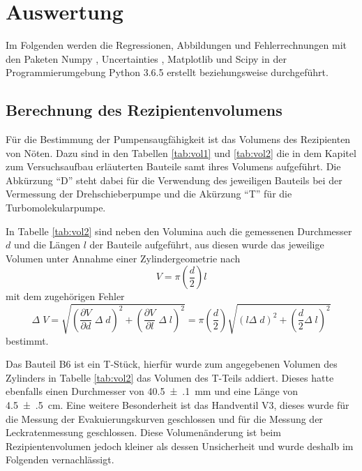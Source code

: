 \newpage
\section{Auswertung}
\label{sec:Auswertung}

Im Folgenden werden die Regressionen, Abbildungen und Fehlerrechnungen mit den
Paketen Numpy \cite{numpy}, Uncertainties \cite{uncertainties}, Matplotlib
\cite{matplotlib} und Scipy \cite{scipy} in der Programmierumgebung
Python 3.6.5 erstellt beziehungsweise durchgeführt.

\subsection{Berechnung des Rezipientenvolumens}
\label{sec:Volumina}

Für die Bestimmung der Pumpensaugfähigkeit ist das Volumens des Rezipienten
von Nöten. Dazu sind in den Tabellen \ref{tab:vol1} und \ref{tab:vol2} die
in dem Kapitel zum Versuchsaufbau erläuterten Bauteile samt ihres Volumens aufgeführt.
Die Abkürzung \enquote{D} steht dabei für die Verwendung
des jeweiligen Bauteils bei der Vermessung der
Drehschieberpumpe und die Akürzung \enquote{T} für die Turbomolekularpumpe.



In Tabelle \ref{tab:vol2} sind neben den Volumina auch die gemessenen
Durchmesser $d$ und die Längen $l$ der Bauteile aufgeführt, aus diesen wurde
das jeweilige Volumen unter Annahme einer Zylindergeometrie nach
\begin{equation*}
  V = \pi \left(\frac{d}{2}\right) l
\end{equation*}
mit dem zugehörigen Fehler
\begin{equation*}
  \Delta \; V =
  \sqrt{\left(\frac{\partial V}{\partial d} \;\Delta \; d\right)^2 +
  \left(\frac{\partial V}{\partial l} \;\Delta \; l\right)^2} =
  \pi \left(\frac{d}{2}\right) \sqrt{
  \left(l \Delta \; d \right)^2 +
  \left( \frac{d}{2} \Delta \; l\right)^2}
\end{equation*}
bestimmt.



Das Bauteil B6 ist ein T-Stück, hierfür wurde zum angegebenen Volumen des Zylinders
in Tabelle \ref{tab:vol2}
das Volumen des T-Teils addiert. Dieses hatte ebenfalls einen Durchmesser
von \SI{40.5(1)}{\milli\meter} und eine Länge von \SI{4.5(5)}{\centi\meter}.
Eine weitere Besonderheit ist das Handventil V3, dieses wurde für die Messung
der Evakuierungskurven geschlossen und für die Messung der Leckratenmessung
geschlossen. Diese Volumenänderung ist beim Rezipientenvolumen jedoch kleiner
als dessen Unsicherheit und
wurde deshalb im Folgenden vernachlässigt.

